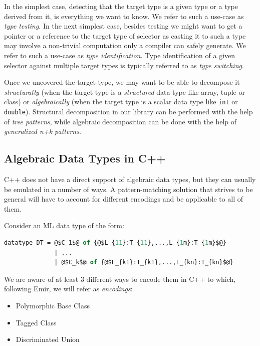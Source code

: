 \documentclass[preprint]{sigplanconf}
\makeatletter
\DeclareRobustCommand{\code}[1]{{\lstinline[breaklines=false,escapechar=@]{#1}}}
\makeatother
\begin{document}
In the simplest case, detecting that the target type is a given type or a type 
derived from it, is everything we want to know. We refer to such a use-case as 
\emph{type testing}. In the next simplest case, besides testing we might want to 
get a pointer or a reference to the target type of selector as casting it to such 
a type may involve a non-trivial computation only a compiler can safely 
generate. We refer to such a use-case as \emph{type identification}. Type 
identification of a given selector against multiple target types is typically 
referred to as \emph{type switching}.

Once we uncovered the target type, we may want to be able to decompose it 
\emph{structurally} (when the target type is a \emph{structured} data type like 
array, tuple or class) or \emph{algebraically} (when the target type is a scalar 
data type like \code{int} or \code{double}). Structural decomposition in our 
library can be performed with the help of \emph{tree patterns}, while algebraic 
decomposition can be done with the help of \emph{generalized n+k patterns}.

\subsection{Algebraic Data Types in C++}
\label{sec:adt}

C++ does not have a direct support of algebraic data types, but they can usually 
be emulated in a number of ways. A pattern-matching solution that strives to be 
general will have to account for different encodings and be applicable to all of 
them.

Consider an ML data type of the form:

\begin{lstlisting}[language=ML,keepspaces,columns=flexible,escapechar=@]
datatype DT = @$C_1$@ of {@$L_{11}:T_{11},...,L_{1m}:T_{1m}$@} 
              | ...
              | @$C_k$@ of {@$L_{k1}:T_{k1},...,L_{kn}:T_{kn}$@}
\end{lstlisting}

\noindent We are aware of at least 3 different ways to encode them in C++ to 
which, following Emir, we will refer as \emph{encodings}:

\begin{itemize}
\item Polymorphic Base Class
\item Tagged Class
\item Discriminated Union
\end{itemize}
\end{document}
